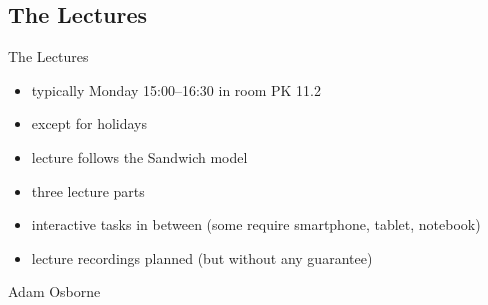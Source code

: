 \subsection{The Lectures}
\begin{frame}{\insertsubsection}
	\begin{fancycolumns}[widths={60}]
		\begin{definition}{The Lectures}
			\begin{itemize}
				\item typically Monday 15:00--16:30 in room PK 11.2
				\item except for holidays 
				\item lecture follows the Sandwich model
				\item three lecture parts
				\item interactive tasks in between (some require smartphone, tablet, notebook)
				\item lecture recordings planned (but without any guarantee)
			\end{itemize}
		\end{definition}
	\nextcolumn
		\begin{note}{Adam Osborne} %
		\end{note}
	\end{fancycolumns}
\end{frame}

